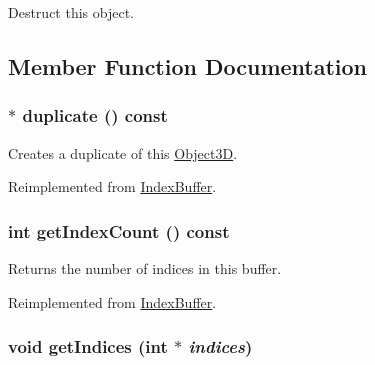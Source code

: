 Destruct this object. 

\subsection{Member Function Documentation}
\hypertarget{classm3g_1_1TriangleStripArray_1623fbdfe91eb2e9d4a67bece6a46904}{
\subsubsection[{duplicate}]{ $\ast$ duplicate () const}}
\label{classm3g_1_1TriangleStripArray_1623fbdfe91eb2e9d4a67bece6a46904}


Creates a duplicate of this \hyperlink{classm3g_1_1Object3D}{Object3D}. 

Reimplemented from \hyperlink{classm3g_1_1IndexBuffer_fab6fc0a0ec393e527f849c3af10ad76}{IndexBuffer}.\hypertarget{classm3g_1_1TriangleStripArray_fe9ae2993ebcdb93d5ff26d57c81b73e}{
\subsubsection[{getIndexCount}]{\setlength{\rightskip}{0pt plus 5cm}int getIndexCount () const}}
\label{classm3g_1_1TriangleStripArray_fe9ae2993ebcdb93d5ff26d57c81b73e}


Returns the number of indices in this buffer. 

Reimplemented from \hyperlink{classm3g_1_1IndexBuffer_fe9ae2993ebcdb93d5ff26d57c81b73e}{IndexBuffer}.\hypertarget{classm3g_1_1TriangleStripArray_650953afac45099025a524ab160b911f}{
\subsubsection[{getIndices}]{\setlength{\rightskip}{0pt plus 5cm}void getIndices (int $\ast$ {\em indices})}}
\label{classm3g_1_1TriangleStripArray_650953afac45099025a524ab160b911f}


